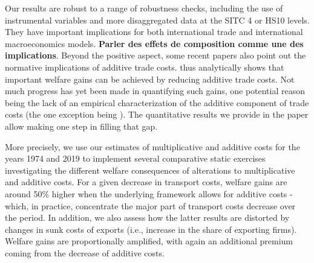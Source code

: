 \documentclass[a4paper,11pt]{article}
\begin{document}
Our results are robust to a range of robustness checks, including the use of instrumental variables and more disaggregated data at the SITC 4 or HS10 levels. They have important implications for both international trade and international macroeconomics models. \textbf{Parler des effets de composition comme une des implications}. Beyond the positive aspect, some recent papers also point out the normative implications of additive trade costs. \cite{sorensen2014} thus analytically shows that important welfare gains can be achieved by reducing additive trade costs. Not much progress has yet been made in quantifying such gains, one potential reason being the lack of an empirical characterization of the additive component of trade costs (the one exception being \citealp{Irrazabal_2015}). The quantitative results we provide in the paper allow making one step in filling that gap. %


More precisely, we use our estimates of multiplicative and additive costs for the years 1974 and 2019 to implement several comparative static exercises investigating the different welfare consequences of alterations to multiplicative and additive costs. For a given decrease in transport costs, welfare gains are around 50\% higher when the underlying framework allows for additive costs - which, in practice, concentrate the major part of transport costs decrease over the period. In addition, we also assess how the latter results are distorted by changes in sunk costs of exports (i.e., increase in the share of exporting firms). Welfare gains are proportionally amplified, with again an additional premium coming from the decrease of additive costs.

\end{document}
